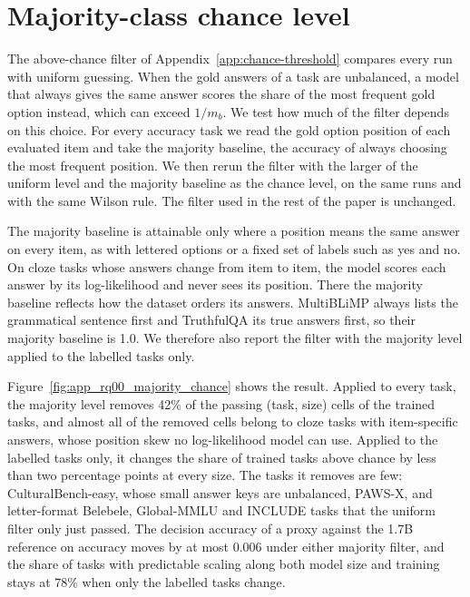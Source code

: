 \clearpage
\section{Majority-class chance level}
\label{app:majority_chance}

The above-chance filter of Appendix~\ref{app:chance-threshold} compares every run with uniform guessing. When the gold answers of a task are unbalanced, a model that always gives the same answer scores the share of the most frequent gold option instead, which can exceed $1/m_b$. We test how much of the filter depends on this choice. For every accuracy task we read the gold option position of each evaluated item and take the majority baseline, the accuracy of always choosing the most frequent position. We then rerun the filter with the larger of the uniform level and the majority baseline as the chance level, on the same runs and with the same Wilson rule. The filter used in the rest of the paper is unchanged.

The majority baseline is attainable only where a position means the same answer on every item, as with lettered options or a fixed set of labels such as yes and no. On cloze tasks whose answers change from item to item, the model scores each answer by its log-likelihood and never sees its position. There the majority baseline reflects how the dataset orders its answers. MultiBLiMP always lists the grammatical sentence first and TruthfulQA its true answers first, so their majority baseline is 1.0. We therefore also report the filter with the majority level applied to the labelled tasks only.

Figure~\ref{fig:app_rq00_majority_chance} shows the result. Applied to every task, the majority level removes 42\% of the passing (task, size) cells of the trained tasks, and almost all of the removed cells belong to cloze tasks with item-specific answers, whose position skew no log-likelihood model can use. Applied to the labelled tasks only, it changes the share of trained tasks above chance by less than two percentage points at every size. The tasks it removes are few: CulturalBench-easy, whose small answer keys are unbalanced, PAWS-X, and letter-format Belebele, Global-MMLU and INCLUDE tasks that the uniform filter only just passed. The decision accuracy of a proxy against the 1.7B reference on accuracy moves by at most 0.006 under either majority filter, and the share of tasks with predictable scaling along both model size and training stays at 78\% when only the labelled tasks change.


